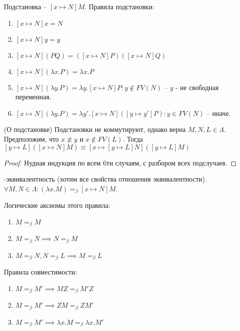 \begin{definition}
    Подстановка -- $[x \mapsto N]M$. Правила подстановки:
    \begin{enumerate}
        \item $[x \mapsto N]x = N$
        \item $[x \mapsto N]y = y$
        \item $[x \mapsto N](PQ) = ([x \mapsto N]P)([x \mapsto N]Q)$
        \item $[x \mapsto N](\lambda x. P) = \lambda x. P$
        \item $[x \mapsto N](\lambda y. P) = \lambda y. [x \mapsto N]P: y \notin FV(N)$ -- $y$ - не свободная переменная.
        \item $[x \mapsto N](\lambda y. P) = \lambda y'. [x \mapsto N]([y \mapsto y'] P): y \in FV(N)$ -- иначе.
    \end{enumerate}
\end{definition}

\begin{lemma}
    (О подстановке) Подстановки не коммутируют, однако верна $M, N, L \in \Lambda$. Предположим, что $x \not\equiv y$ и $x \notin FV(L)$. Тогда $[y \mapsto L]([x \mapsto N]M) \equiv [x \mapsto [y \mapsto L]N]([y \mapsto L]M)$
\end{lemma}
\begin{proof}
    Нудная индукция по всем 6ти случаям, с разбором всех подслучаев.
\end{proof}

\begin{definition}
    \beta-эквивалентность (хотим все свойства отношения эквивалентности). $\forall M, N \in \Lambda: (\lambda x. M) =_{\beta} [x \mapsto N]M$.
\end{definition}


Логические аксиомы этого правила:
\begin{enumerate}
    \item $M =_{\beta} M$ \\ 
    \item $M =_{\beta} N \implies N =_{\beta} M$ \\ 
    \item $M =_{\beta} N, N =_{\beta} L \implies M =_{\beta} L$ \\
\end{enumerate}


Правила совместимости:
\begin{enumerate}
    \item $M =_{\beta} M' \implies MZ =_{\beta} M'Z$ \\
    \item $M =_{\beta} M' \implies ZM =_{\beta} ZM'$ \\
    \item $M =_{\beta} M' \implies \lambda x. M =_{\beta} \lambda x. M'$ \\
\end{enumerate}

